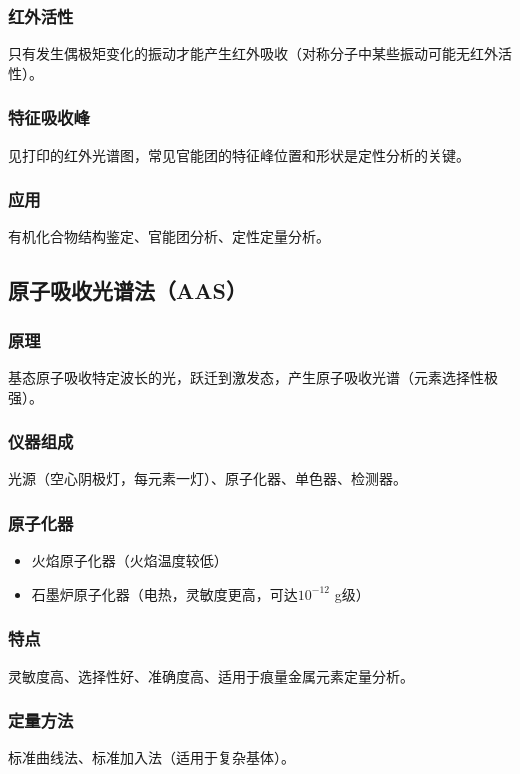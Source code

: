 \documentclass[11pt,a4paper]{article}
\begin{document}
\subsubsection{红外活性}
只有发生偶极矩变化的振动才能产生红外吸收（对称分子中某些振动可能无红外活性）。

\subsubsection{特征吸收峰}
见打印的红外光谱图，常见官能团的特征峰位置和形状是定性分析的关键。

\subsubsection{应用}
有机化合物结构鉴定、官能团分析、定性定量分析。

\subsection{原子吸收光谱法（AAS）}

\subsubsection{原理}
基态原子吸收特定波长的光，跃迁到激发态，产生原子吸收光谱（元素选择性极强）。

\subsubsection{仪器组成}
光源（空心阴极灯，每元素一灯）、原子化器、单色器、检测器。

\subsubsection{原子化器}
\begin{itemize}
    \item 火焰原子化器（火焰温度较低）
    \item 石墨炉原子化器（电热，灵敏度更高，可达$10^{-12}$ g级）
\end{itemize}

\subsubsection{特点}
灵敏度高、选择性好、准确度高、适用于痕量金属元素定量分析。

\subsubsection{定量方法}
标准曲线法、标准加入法（适用于复杂基体）。
\end{document}
